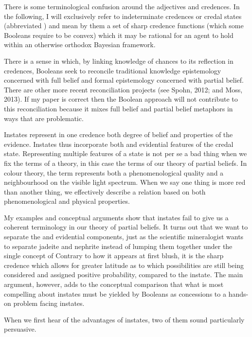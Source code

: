 \documentclass[11pt]{article}
\begin{document}
There is some terminological confusion around the adjectives
  and  credences.
In the following, I will exclusively refer to indeterminate credences
or credal states (abbreviated ) and mean by them a set
of sharp credence functions (which some Booleans require to be convex)
which it may be rational for an agent to hold within an otherwise
orthodox Bayesian framework.

There is a sense in which, by linking knowledge of chances to its
reflection in credences, Booleans seek to reconcile traditional
knowledge epistemology concerned with full belief and formal
epistemology concerned with partial belief. There are other more
recent reconciliation projects (see Spohn, 2012; and Moss, 2013). If
my paper is correct then the Boolean approach will not contribute to
this reconciliation because it mixes full belief and partial belief
metaphors in ways that are problematic.

Instates represent in one credence both degree of belief and
properties of the evidence. Instates thus incorporate both {\doxnotep}
and evidential features of the credal state. Representing multiple
features of a state is not per se a bad thing when we fix the terms of
a theory, in this case the terms of our theory of partial beliefs. In
colour theory, the term  represents both a phenomenological
quality and a neighbourhood on the visible light spectrum. When we say
one thing is more red than another thing, we effectively describe a
relation based on both phenomenological and physical properties.

My examples and conceptual arguments show that instates fail to give
us a coherent terminology in our theory of partial beliefs. It turns
out that we want to separate the {\doxnotep} and evidential
components, just as the scientific mineralogist wants to separate
jadeite and nephrite instead of lumping them together under the single
concept of  Contrary to how it appears at first blush, it
is the sharp credence which allows for greater latitude as to which
possibilities are still being considered and assigned positive
probability, compared to the instate. The main argument, however, adds
to the conceptual comparison that what is most compelling about
instates must be yielded by Booleans as concessions to a hands-on
problem facing instates.

When we first hear of the advantages of instates, two of them sound
particularly persuasive.
\end{document}

